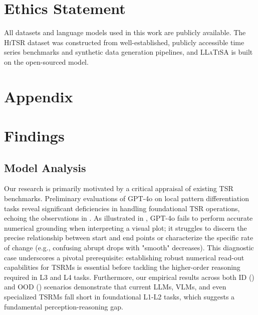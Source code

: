 \documentclass[11pt]{article}
\begin{document}
\section*{Ethics Statement}
All datasets and language models used in this work are publicly available. The \textsc{HiTSR} dataset was constructed from well-established, publicly accessible time series benchmarks and synthetic data generation pipelines, and \textsc{LLaTiSA} is built on the open-sourced model.


%



\appendix
\section*{Appendix}

\section{Findings}\label{sec:findings}
\subsection{Model Analysis}\label{subsec:model_findings}
Our research is primarily motivated by a critical appraisal of existing TSR benchmarks. Preliminary evaluations of GPT-4o on local pattern differentiation tasks reveal significant deficiencies in handling foundational TSR operations, echoing the observations in \cite{bedtime}. As illustrated in , GPT-4o fails to perform accurate numerical grounding when interpreting a visual plot; it struggles to discern the precise relationship between start and end points or characterize the specific rate of change (e.g., confusing abrupt drops with "smooth" decreases). This diagnostic case underscores a pivotal prerequisite: establishing robust numerical read-out capabilities for TSRMs is essential before tackling the higher-order reasoning required in L3 and L4 tasks. Furthermore, our empirical results across both ID () and OOD () scenarios demonstrate that current LLMs, VLMs, and even specialized TSRMs fall short in foundational L1-L2 tasks, which suggests a fundamental perception-reasoning gap.
\end{document}
